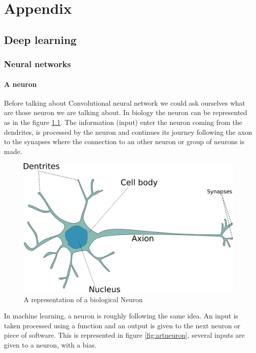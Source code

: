 \appendix \chapter{Appendix} 


\section{Deep learning}\label{Annexe:deeplearning}
\subsection{Neural networks}
\subsubsection{A neuron}

Before talking about Convolutional neural network we could ask ourselves what are those neuron we are talking about. In biology the neuron can be represented as in the figure \ref{fig:bioneuron}. The information (input) enter the neuron coming from the dendrites, is processed by the neuron and continues its journey following the axon to the synapses where the connection to an other neuron or group of neurons is made.
\begin{figure}[h!]
   \centerline{\includegraphics[scale=0.30]{./pics/neuronb.png}}
   \caption{A representation of a biological Neuron}
   \label{fig:bioneuron}
\end{figure}

In machine learning, a neuron is roughly following the same idea. An input is taken processed using a function and an output is given to the next neuron or piece of software. This is represented in figure \ref{fig:artneuron}, several inputs are given to a neuron, with a bias. 

